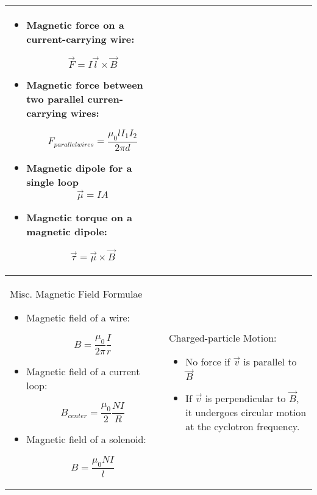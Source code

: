 \documentclass{article}
\begin{document}
\begin{center}
\begin{longtable}{|p{9cm}|p{9cm}|}
\begin{itemize}
			\item Magnetic force on a current-carrying wire:

			      \[ \vec{F} = I\vec{l} \times \vec{B} \]

			\item Magnetic force between two parallel curren-carrying wires:

			      \[ F_{parallel wires} = \frac{\mu_0 l I_1 I_2}{2 \pi d}\]

			\item Magnetic dipole for a single loop \[\vec{\mu} = IA\]

			\item Magnetic torque on a magnetic dipole:

			      \[ \vec{\tau} = \vec{\mu} \times \vec{B}\]

		\end{itemize}                       \\

		\hline



		Misc. Magnetic Field Formulae

		\begin{itemize}

			\item Magnetic field of a wire:

			      \[B = \frac{ \mu_0 }{2\pi} \frac{I}{r}\]

			\item Magnetic field of a current loop:

			      \[B_{center} = \frac{ \mu_0 }{2}\frac{NI}{R}\]

			\item Magnetic field of a solenoid:

			      \[B = \frac{ \mu_0 NI}{l}\]

		\end{itemize}



		                &



		Charged-particle Motion:

		\begin{itemize}

			\item No force if $\vec{v}$ is parallel to $\vec{B}$

			\item If $\vec{v}$ is perpendicular to $\vec{B}$, it undergoes circular motion at the cyclotron frequency.


\end{itemize}
\end{longtable}
\end{center}
\end{document}
